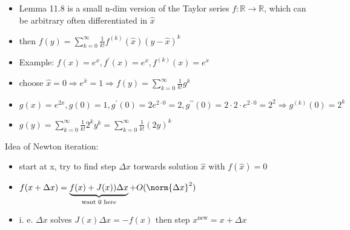 \newpage
{
%
	\blank
	\begin{itemize}
		\item Lemma 11.8 is a small n-dim version of the Taylor series $f: \mathbb{R}\rightarrow \mathbb{R}$, which can be arbitrary often differentiated in $\hat{x}$\\
		\item[] then $f(y) = \sum\limits_{k=0}^\infty \frac{1}{k!} f^{(k)}(\hat{x})(y-\hat{x})^k$\\
		\item Example: $f(x) = e^x, f^\prime (x) = e^x, f^{(k)} (x) = e^x$\\
		\item[] choose $\hat{x} = 0 \Rightarrow e^{\hat{x}}=1 \Rightarrow f(y) = \sum\limits_{k=0}^\infty \frac{1}{k!} g^k$\\
		\item[] $g(x) = e^{2x}, g(0) = 1, g^\prime(0) = 2e^{2\cdot 0}=2, g^{\prime\prime} (0) = 2\cdot 2 \cdot e^{2\cdot 0}= 2^2 \Rightarrow g^{(k)} (0) = 2^k$\\
		\item[] $g(y) = \sum\limits_{k=0}^\infty \frac{1}{k!} 2^k y^k = \sum\limits_{k=0}^\infty \frac{1}{k!} (2y)^k$
	\end{itemize}
%
\newpage
Idea of Newton iteration:\\
	\begin{itemize}
		\item start at x, try to find step $\Delta x$ torwards solution $\hat{x}$ with $f(\hat{x})=0$\\
		\item[] $f(x+\Delta x) = \underbrace{f(x) + J(x))\Delta x}_{\text{want 0 here}} + O(\norm{\Delta x}^2)$\\
		\item[] i. e. $\Delta x$ solves $J(x)\Delta x = -f(x)$ then step $x^{\text{new}} = x + \Delta x$
	\end{itemize}
}

